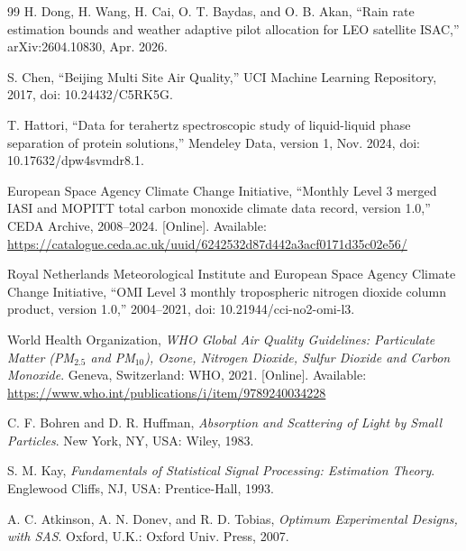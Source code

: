 \documentclass[conference]{IEEEtran}
\begin{document}
\begin{thebibliography}{99}
H. Dong, H. Wang, H. Cai, O. T. Baydas, and O. B. Akan, ``Rain rate estimation bounds and weather adaptive pilot allocation for LEO satellite ISAC,'' arXiv:2604.10830, Apr. 2026.

S. Chen, ``Beijing Multi Site Air Quality,'' UCI Machine Learning Repository, 2017, doi: 10.24432/C5RK5G.

T. Hattori, ``Data for terahertz spectroscopic study of liquid-liquid phase separation of protein solutions,'' Mendeley Data, version 1, Nov. 2024, doi: 10.17632/dpw4svmdr8.1.

European Space Agency Climate Change Initiative, ``Monthly Level 3 merged IASI and MOPITT total carbon monoxide climate data record, version 1.0,'' CEDA Archive, 2008--2024. [Online]. Available: \url{https://catalogue.ceda.ac.uk/uuid/6242532d87d442a3acf0171d35c02e56/}

Royal Netherlands Meteorological Institute and European Space Agency Climate Change Initiative, ``OMI Level 3 monthly tropospheric nitrogen dioxide column product, version 1.0,'' 2004--2021, doi: 10.21944/cci-no2-omi-l3.

World Health Organization, \emph{WHO Global Air Quality Guidelines: Particulate Matter (PM$_{2.5}$ and PM$_{10}$), Ozone, Nitrogen Dioxide, Sulfur Dioxide and Carbon Monoxide}. Geneva, Switzerland: WHO, 2021. [Online]. Available: \url{https://www.who.int/publications/i/item/9789240034228}

C. F. Bohren and D. R. Huffman, \emph{Absorption and Scattering of Light by Small Particles}. New York, NY, USA: Wiley, 1983.

S. M. Kay, \emph{Fundamentals of Statistical Signal Processing: Estimation Theory}. Englewood Cliffs, NJ, USA: Prentice-Hall, 1993.

A. C. Atkinson, A. N. Donev, and R. D. Tobias, \emph{Optimum Experimental Designs, with SAS}. Oxford, U.K.: Oxford Univ. Press, 2007.

\end{thebibliography}
\end{document}
